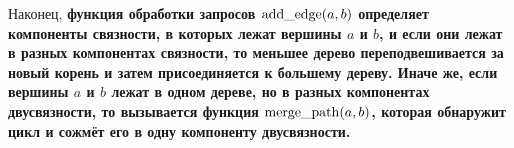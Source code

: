 Наконец, \bf{функция обработки запросов} ${\rm add\_edge}(a,b)$ определяет компоненты связности, в которых лежат вершины $a$ и $b$, и если они лежат в разных компонентах связности, то меньшее дерево переподвешивается за новый корень и затем присоединяется к большему дереву. Иначе же, если вершины $a$ и $b$ лежат в одном дереве, но в разных компонентах двусвязности, то вызывается функция ${\rm merge\_path}(a,b)$, которая обнаружит цикл и сожмёт его в одну компоненту двусвязности.



